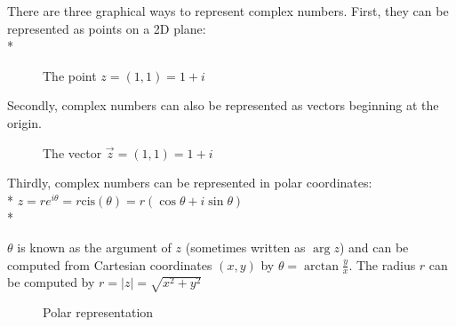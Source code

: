\documentclass[]{article}
\begin{document}
	    \noindent There are three graphical ways to represent complex numbers. First, they can be represented as points on a 2D plane: \\* 
	    
	    \begin{figure}[!h]
	    	\centering
      	    \caption{The point $z=(1,1)=1+i$}
      	\end{figure}
	    
	    \noindent Secondly, complex numbers can also be represented as vectors beginning at the origin.
	    \begin{figure}[!h]
	    	\centering
            \caption{The vector $\vec{z}=(1,1)=1+i$}
        \end{figure}
    
        \noindent Thirdly, complex numbers can be represented in polar coordinates: \\*  
        \noindent $z=re^{i\theta}=r\mathrm{cis}(\theta)=r(\cos{\theta}+i\sin{\theta})$ \\*
    
        \noindent $\theta$ is known as the argument of $z$ (sometimes written as $\arg{z}$) and can be computed from Cartesian coordinates $(x,y)$ by $\theta=\arctan{\frac{y}{x}}$. The radius $r$ can be computed by $r=\left|z\right|=\sqrt{x^2+y^2}$
        
        \begin{figure}[!h]
        	\centering
        	\caption{Polar representation}
        \end{figure}
\end{document}

